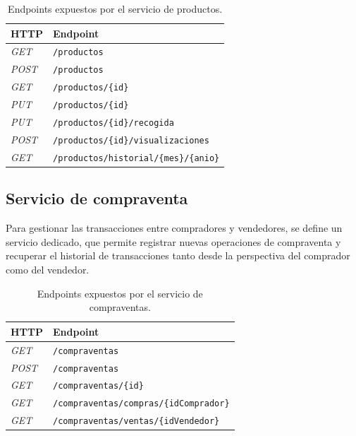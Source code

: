 \documentclass[11pt]{article}
\begin{document}
      \setlength{\tabcolsep}{15pt}
      \begin{table}[H]
          \centering
          \begin{tabular}{l l}
              \hline
              \textbf{HTTP} & \textbf{Endpoint}                              \\
              \hline
              \textit{GET}  & \texttt{/productos}                            \\
              \textit{POST} & \texttt{/productos}                            \\
              \textit{GET}  & \texttt{/productos/\{id\}}                     \\
              \textit{PUT}  & \texttt{/productos/\{id\}}                     \\
              \textit{PUT}  & \texttt{/productos/\{id\}/recogida}            \\
              \textit{POST} & \texttt{/productos/\{id\}/visualizaciones}     \\
              \textit{GET}  & \texttt{/productos/historial/\{mes\}/\{anio\}} \\
              \hline
          \end{tabular}
          \caption{Endpoints expuestos por el servicio de productos.}
          \label{tab:endpoints-productos}
      \end{table}

  \subsection{Servicio de compraventa}

      Para gestionar las transacciones entre compradores y vendedores, se define un
      servicio dedicado, que permite registrar nuevas operaciones de compraventa y
      recuperar el historial de transacciones tanto desde la perspectiva del
      comprador como del vendedor.

      \setlength{\tabcolsep}{15pt}
      \begin{table}[H]
          \centering
          \begin{tabular}{l l}
              \hline
              \textbf{HTTP} & \textbf{Endpoint}                              \\
              \hline
              \textit{GET}  & \texttt{/compraventas}                         \\
              \textit{POST} & \texttt{/compraventas}                         \\
              \textit{GET}  & \texttt{/compraventas/\{id\}}                  \\
              \textit{GET}  & \texttt{/compraventas/compras/\{idComprador\}} \\
              \textit{GET}  & \texttt{/compraventas/ventas/\{idVendedor\}}   \\
              \hline
          \end{tabular}
          \caption{Endpoints expuestos por el servicio de compraventas.}
          \label{tab:endpoints-compraventas}
      \end{table}
\end{document}
